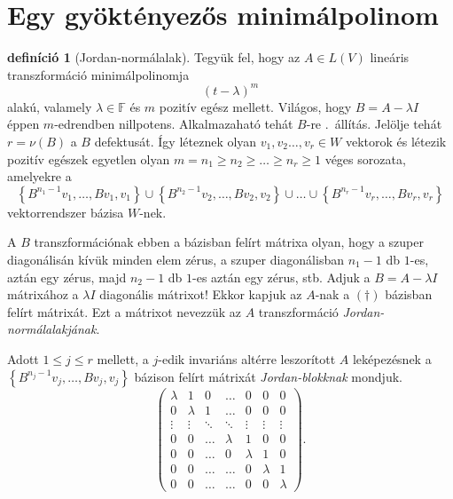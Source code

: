 \documentclass[9pt, a4paper, showtrims]{memoir}
\theoremstyle{plain}
\theoremstyle{remark}
\theoremstyle{definition}
\newtheorem{definition}[proposition]{definíció}
\begin{document}
\section{Egy gyöktényezős minimálpolinom}
\begin{definition}[Jordan-normálalak]
        Tegyük fel, hogy az $A\in L\left( V \right)$ lineáris transzformáció
        minimálpolinomja 
        \[
            \left( t-\lambda \right)^m
        \]
        alakú, valamely $\lambda\in\mathbb{F}$ és $m$ pozitív egész mellett.
        Világos, hogy $B=A-\lambda I$ éppen $m$-edrendben nillpotens.
        Alkalmazaható tehát $B$-re .~állítás.
        Jelölje tehát $r=\nu\left( B \right)$ a $B$ defektusát.
        Így léteznek olyan $v_1,v_2\dots,v_r\in W$ vektorok és 
        létezik pozitív egészek egyetlen olyan $m=n_1\geq n_2\geq \dots\geq n_r\geq 1$ véges sorozata,
        amelyekre a
        \[
            \left\{ B^{n_1-1}v_1,\dots,Bv_1,v_1 \right\}
            \cup
            \left\{ B^{n_2-1}v_2,\dots,Bv_2,v_2 \right\}
            \cup
            \ldots
            \cup
            \left\{ B^{n_r-1}v_r,\dots,Bv_r,v_r \right\}
            \tag{\dag}
        \]
        vektorrendszer bázisa $W$-nek. 

        A $B$ transzformációnak ebben a bázisban felírt mátrixa olyan, hogy
        a szuper diagonálisán kívük minden elem zérus,
        a szuper diagonálisban $n_1-1$ db $1$-es, aztán egy zérus, majd $n_2-1$ db $1$-es aztán egy zérus, stb.
        Adjuk a $B=A-\lambda I$ mátrixához a $\lambda I$ diagonális mátrixot!
        Ekkor kapjuk az $A$-nak a $(\dag)$ bázisban felírt mátrixát.
        Ezt a mátrixot nevezzük az $A$ transzformáció \emph{Jordan-normálalakjának}.
\end{definition}
Adott $1\leq j\leq r$ mellett, 
a $j$-edik invariáns altérre leszorított $A$ leképezésnek a 
\begin{math}
    \left\{ B^{n_j-1}v_j,\dots,Bv_j,v_j \right\}
\end{math}
bázison felírt mátrixát \emph{Jordan-blokknak} mondjuk.
\[
    \begin{pmatrix}
        \lambda&1&0&\dots& 0 &0&0\\
        0&\lambda&1&\dots& 0 &0&0\\
        \vdots&\vdots&\ddots&\ddots&\vdots&\vdots&\vdots\\
        0&0&\dots&\lambda& 1 &0&0\\
        0&0&\dots&0& \lambda&1&0\\
        0&0&\dots&\dots& 0 &\lambda&1\\
        0&0&\dots&\dots& 0 &0&\lambda
    \end{pmatrix}.
\]
\end{document}
